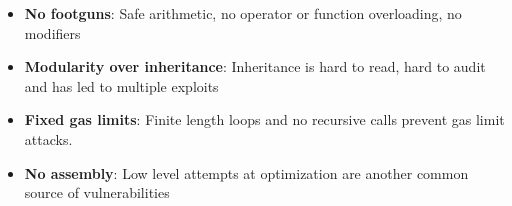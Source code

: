 \documentclass[aspectratio=169]{beamer}
\begin{document}
\begin{frame}
\begin{columns}[T,totalwidth=\textwidth]
\begin{column}{0.65\textwidth}
			\begin{itemize}
				\item \textbf{No footguns}: Safe arithmetic, no operator or function overloading, no modifiers\\
				\item \textbf{Modularity over inheritance}: Inheritance is hard to read, hard to audit and has led to multiple exploits\\
				\item \textbf{Fixed gas limits}: Finite length loops and no recursive calls prevent gas limit attacks.
				\item \textbf{No assembly}: Low level attempts at optimization are another common source of vulnerabilities\\
			\end{itemize}
			
		\end{column}
	\end{columns}
\end{frame}
\end{document}
